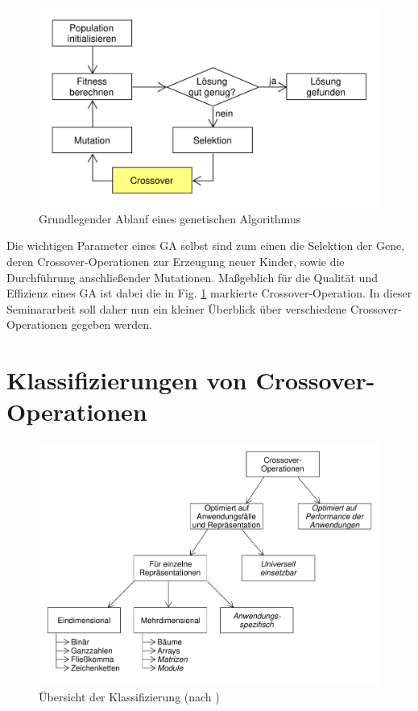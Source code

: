 \documentclass{llncs}
\begin{document}
	\begin{figure}
		\centering
		\includegraphics[width=.8\columnwidth]{./Figures/GA-Prinzip.pdf}
		\caption{Grundlegender Ablauf eines genetischen Algorithmus}
		\label{fig:abb1}
	\end{figure}	

	Die wichtigen Parameter eines GA selbst sind zum einen die Selektion der Gene, deren Crossover-Operationen zur Erzeugung neuer Kinder, sowie die Durch\-füh\-rung anschließender Mutationen. Maßgeblich für die Qualität und Effizienz eines GA ist dabei die in Fig. \ref{fig:abb1} markierte Crossover-Operation. In dieser Seminararbeit soll daher nun ein kleiner Überblick über verschiedene Crossover-Operationen gegeben werden.

\section{Klassifizierungen von Crossover-Operationen}
\label{sec:KlassifizierungCrossover}

	\begin{figure}
		\centering
		\includegraphics[width=.8\columnwidth]{./Figures/Crossover-Klassifizierung.pdf}
		\caption{Übersicht der Klassifizierung (nach \cite{Survey})}
		\label{fig:abb2}
	\end{figure}
\end{document}
